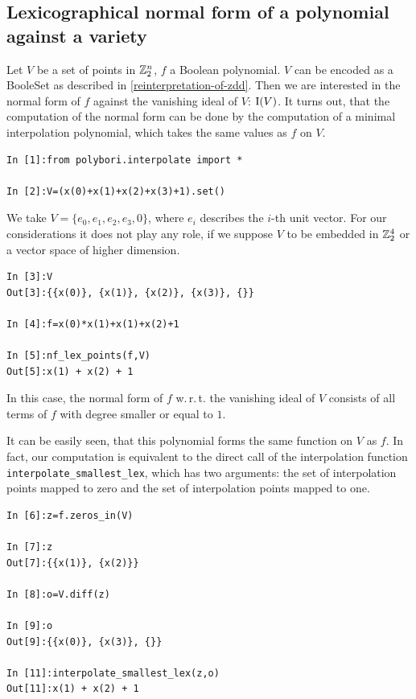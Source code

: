 \subsection{Lexicographical normal form of a polynomial against a variety}

Let $V$ be a set of points in $\mathbb{Z}_2^n$, $f$ a Boolean polynomial. $V$ can be encoded as a BooleSet as described in \ref{reinterpretation-of-zdd}.
Then we are interested in the normal form of $f$ against the vanishing ideal of $V$: $\operatorname{I}(V)$.
It turns out, that the computation of the normal form can be done by the computation of a minimal interpolation polynomial, which takes the same values as $f$ on $V$.

\begin{lstlisting}
In [1]:from polybori.interpolate import *

In [2]:V=(x(0)+x(1)+x(2)+x(3)+1).set()
\end{lstlisting}

We take $V=\{e_0,e_1,e_2,e_3,0\}$, where $e_i$ describes the $i$-th unit vector. For our considerations it does not play any role, if we suppose $V$ to be embedded in $\mathbb{Z}_2^4$ or a vector space of higher dimension.

\begin{lstlisting}
In [3]:V
Out[3]:{{x(0)}, {x(1)}, {x(2)}, {x(3)}, {}}

In [4]:f=x(0)*x(1)+x(1)+x(2)+1

In [5]:nf_lex_points(f,V)
Out[5]:x(1) + x(2) + 1
\end{lstlisting}

In this case, the normal form of $f$ w.\,r.\,t. the vanishing ideal of $V$ consists of all terms of $f$ with degree smaller or equal to $1$.

It can be easily seen, that this polynomial forms the same function on $V$ as $f$.
In fact, our computation is equivalent to the direct call of the interpolation function \lstinline|interpolate_smallest_lex|, which has two arguments: the set of interpolation points mapped to zero and the set of interpolation points mapped to one.

\begin{lstlisting}
In [6]:z=f.zeros_in(V)

In [7]:z
Out[7]:{{x(1)}, {x(2)}}

In [8]:o=V.diff(z)

In [9]:o
Out[9]:{{x(0)}, {x(3)}, {}}

In [11]:interpolate_smallest_lex(z,o)
Out[11]:x(1) + x(2) + 1
\end{lstlisting}
